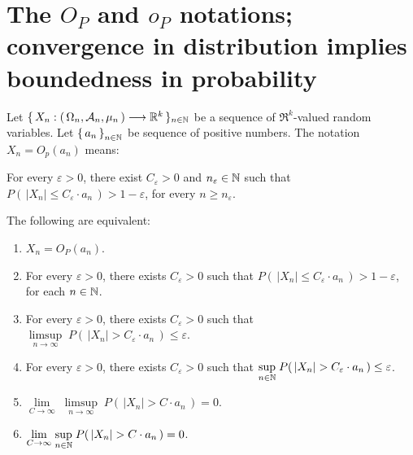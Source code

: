 

\section{The $O_{P}$ and $o_{P}$ notations; convergence in distribution implies boundedness in probability}
\setcounter{theorem}{0}
\setcounter{equation}{0}

\cite{DevilleSarndal1992}

\begin{definition}
\mbox{}\vskip 0.1cm
\noindent
Let $\{\,X_{n} : \left(\,\Omega_{n},\mathcal{A}_{n},\mu_{n}\,\right) \longrightarrow \mathbb{R}^{k}\,\}_{n \in \mathbb{N}}$
be a sequence of $\Re^{k}$-valued random variables.
Let $\left\{\,a_{n}\,\right\}_{n \in \mathbb{N}}$ be sequence of positive numbers.
The notation $X_{n} = O_{p}(a_{n})$ means:
\begin{center}
For every $\varepsilon > 0$, there exist $C_{\varepsilon} > 0$ and $n_{\varepsilon} \in \mathbb{N}$
such that $P\!\left(\,|X_{n}| \leq C_{\varepsilon}\cdot a_{n}\,\right) > 1 - \varepsilon$, for every $n \geq n_{\varepsilon}$. 
\end{center}
\end{definition}

\renewcommand{\theenumi}{\alph{enumi}}
\renewcommand{\labelenumi}{\textnormal{(\theenumi)}$\;\;$}

\begin{proposition}
\quad
The following are equivalent:
\begin{enumerate}
\item \label{bigOPa} $X_{n} = O_{P}(a_{n})$.

\item\label{bigOPb}
For every $\varepsilon > 0$, there exists $C_{\varepsilon} > 0$ such that
$P\!\left(\,|X_{n}| \leq C_{\varepsilon}\cdot a_{n}\,\right) > 1 - \varepsilon$, for each $n \in \mathbb{N}$.

\item\label{bigOPc}
For every $\varepsilon > 0$, there exists $C_{\varepsilon} > 0$ such that
$\underset{n\rightarrow\infty}{\limsup}\;P\!\left(\,|X_{n}| > C_{\varepsilon}\cdot a_{n}\,\right) \leq \varepsilon$.

\item\label{bigOPd}
For every $\varepsilon > 0$, there exists $C_{\varepsilon} > 0$ such that
$\underset{n \in \mathbb{N}}{\sup}\;P\!\left(\,|X_{n}| > C_{\varepsilon}\cdot a_{n}\,\right) \leq \varepsilon$.

\item\label{bigOPe}
$\underset{C\rightarrow\infty}{\lim}\;\underset{n\rightarrow\infty}{\limsup}\;P\!\left(\,|X_{n}| > C \cdot a_{n}\,\right) = 0$.

\item\label{bigOPf}
$\underset{C\rightarrow\infty}{\lim}\;\underset{n\in\mathbb{N}}{\sup}\;P\!\left(\,|X_{n}| > C \cdot a_{n}\,\right) = 0$.

\end{enumerate}
\end{proposition}

